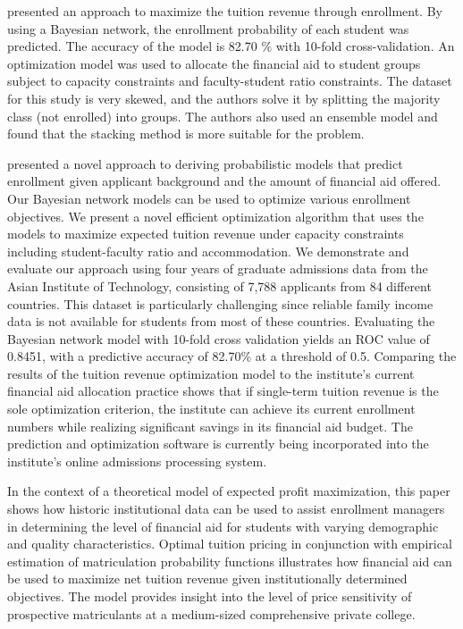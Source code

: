 \documentclass[12pt,english]{report}
\begin{document}
\citet{Thanh2007} presented an approach to maximize the tuition revenue through
enrollment. By using a Bayesian network, the enrollment probability of each
student was predicted. The accuracy of the model is 82.70 $\%$ with 10-fold
cross-validation. An optimization model was used to allocate the financial aid
to
student groups subject to capacity constraints and faculty-student ratio
constraints. The dataset for this study is very skewed, and the authors solve
it by splitting the majority class (not enrolled) into groups. The authors also
used an ensemble model and found that the stacking method is more suitable for
the problem.

\citet{Thanh2007}  presented a novel approach to deriving probabilistic models
that predict enrollment given applicant background and the amount of financial
aid offered. Our Bayesian network models can be used to optimize various
enrollment objectives. We present a novel efficient optimization algorithm that
uses the models to maximize expected tuition revenue under capacity constraints
including student-faculty ratio and accommodation. We demonstrate and
evaluate
our approach using four years of graduate admissions data from the
Asian
Institute of Technology, consisting of 7,788 applicants from 84 different
countries. This dataset is particularly challenging since reliable family
income data is not available for students from most of these countries.
Evaluating the Bayesian network model with 10-fold cross validation yields an
ROC value of 0.8451, with a predictive accuracy of 82.70\% at a threshold of
0.5. Comparing the results of the tuition revenue optimization model to the
institute's current financial aid allocation practice shows that if single-term
tuition revenue is the sole optimization criterion, the institute can achieve
its current enrollment numbers while realizing significant savings in its
financial aid budget. The prediction and optimization software is currently
being incorporated into the institute's online admissions processing system.

\citet{Bosshardt2010} In the context of a theoretical model of expected profit
maximization, this paper shows how historic institutional data can be used to
assist enrollment managers in determining the level of financial aid for
students with varying demographic and quality characteristics. Optimal tuition
pricing in conjunction with empirical estimation of matriculation probability
functions illustrates how financial aid can be used to maximize net tuition
revenue given institutionally determined objectives. The model provides insight
into the level of price sensitivity of prospective matriculants at a
medium-sized
comprehensive private college.
\end{document}
